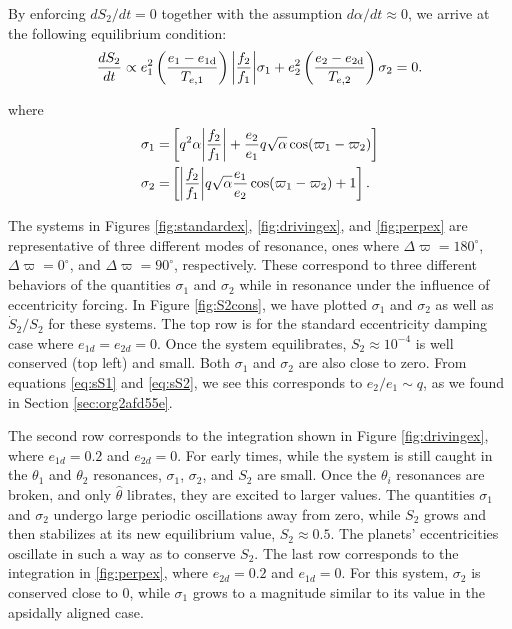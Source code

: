 \documentclass[usenatbib,twocolumn]{mnras}
\DeclarePairedDelimiter{\abs}{|}{|}
\begin{document}
\noindent
By enforcing \(dS_2/dt = 0\) together with the assumption \(d\alpha/dt
\approx 0\), we arrive at the following equilibrium condition:
\begin{align}
  \label{eq:S2eq}
  \frac{dS_2}{dt} \propto e_1^2\left(\frac{e_1-e_{1\rm d}}{T_{e,1}}\right)\abs*{\frac{f_2}{f_1}}
  \sigma_1
  + e_2^2\left(\frac{e_2-e_{2\rm d}}{T_{e,2}}\right)
  \sigma_2
  = 0.
\end{align}

\noindent
where
\begin{align}
  \label{eq:sS1}
  \sigma_1=&\left[
                  q^2\alpha\abs*{\frac{f_2}{f_1}}
                  + \frac{e_2}{e_1}q\sqrt{\alpha}\cos(\varpi_1-\varpi_2)
                  \right]\\
  \label{eq:sS2}
  \sigma_2=&\left[
                  \abs*{\frac{f_2}{f_1}} q\sqrt{\alpha}
                  \frac{e_1}{e_2}\cos(\varpi_1-\varpi_2) + 1
                  \right].
\end{align}

The systems in Figures \ref{fig:standardex}, \ref{fig:drivingex}, and
\ref{fig:perpex} are representative of three different modes of
resonance, ones where \(\Delta\varpi=180^\circ\),
\(\Delta\varpi=0^\circ\), and \(\Delta\varpi=90^\circ\),
respectively. These correspond to three different behaviors of the
quantities \(\sigma_1\) and \(\sigma_2\) while in resonance
under the influence of eccentricity forcing.
In Figure \ref{fig:S2cons}, we have plotted \(\sigma_1\) and
\(\sigma_2\) as well as \(\dot S_2/S_2\) for these systems.  The top
row is for the standard eccentricity damping case where
\(e_{1d}=e_{2d}=0\).  Once the system equilibrates, \(S_2\approx 10^{-4}\)
is well conserved (top left) and small. Both \(\sigma_1\) and
\(\sigma_2\) are also close to zero. From equations \eqref{eq:sS1}
and \eqref{eq:sS2}, we see this corresponds to \(e_2/e_1 \sim q\), as we
found in Section \ref{sec:org2afd55e}.

The second row corresponds to the integration shown in Figure
\ref{fig:drivingex}, where \(e_{1d}=0.2\) and \(e_{2d}=0\).  For early
times, while the system is still caught in the \(\theta_1\) and
\(\theta_2\) resonances, \(\sigma_1\), \(\sigma_2\), and \(S_2\) are
small.  Once the \(\theta_i\) resonances are broken, and only
\(\hat\theta\) librates, they are excited to larger values.  The
quantities \(\sigma_1\) and \(\sigma_2\) undergo large periodic
oscillations away from zero, while \(S_2\) grows and then stabilizes at
its new equilibrium value, \(S_2\approx 0.5\). The planets'
eccentricities oscillate in such a way as to conserve \(S_2\).  The last
row corresponds to the integration in \ref{fig:perpex}, where
\(e_{2d}=0.2\) and \(e_{1d}=0\).  For this system, \(\sigma_2\) is
conserved close to 0, while \(\sigma_1\) grows to a magnitude
similar to its value in the apsidally aligned case.
\end{document}
